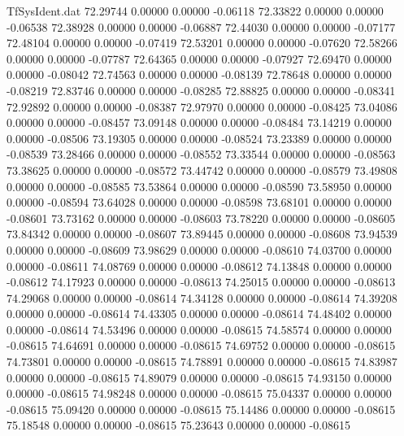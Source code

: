 \begin{filecontents}{TfSysIdent.dat}
  72.29744    0.00000    0.00000   -0.06118
  72.33822    0.00000    0.00000   -0.06538
  72.38928    0.00000    0.00000   -0.06887
  72.44030    0.00000    0.00000   -0.07177
  72.48104    0.00000    0.00000   -0.07419
  72.53201    0.00000    0.00000   -0.07620
  72.58266    0.00000    0.00000   -0.07787
  72.64365    0.00000    0.00000   -0.07927
  72.69470    0.00000    0.00000   -0.08042
  72.74563    0.00000    0.00000   -0.08139
  72.78648    0.00000    0.00000   -0.08219
  72.83746    0.00000    0.00000   -0.08285
  72.88825    0.00000    0.00000   -0.08341
  72.92892    0.00000    0.00000   -0.08387
  72.97970    0.00000    0.00000   -0.08425
  73.04086    0.00000    0.00000   -0.08457
  73.09148    0.00000    0.00000   -0.08484
  73.14219    0.00000    0.00000   -0.08506
  73.19305    0.00000    0.00000   -0.08524
  73.23389    0.00000    0.00000   -0.08539
  73.28466    0.00000    0.00000   -0.08552
  73.33544    0.00000    0.00000   -0.08563
  73.38625    0.00000    0.00000   -0.08572
  73.44742    0.00000    0.00000   -0.08579
  73.49808    0.00000    0.00000   -0.08585
  73.53864    0.00000    0.00000   -0.08590
  73.58950    0.00000    0.00000   -0.08594
  73.64028    0.00000    0.00000   -0.08598
  73.68101    0.00000    0.00000   -0.08601
  73.73162    0.00000    0.00000   -0.08603
  73.78220    0.00000    0.00000   -0.08605
  73.84342    0.00000    0.00000   -0.08607
  73.89445    0.00000    0.00000   -0.08608
  73.94539    0.00000    0.00000   -0.08609
  73.98629    0.00000    0.00000   -0.08610
  74.03700    0.00000    0.00000   -0.08611
  74.08769    0.00000    0.00000   -0.08612
  74.13848    0.00000    0.00000   -0.08612
  74.17923    0.00000    0.00000   -0.08613
  74.25015    0.00000    0.00000   -0.08613
  74.29068    0.00000    0.00000   -0.08614
  74.34128    0.00000    0.00000   -0.08614
  74.39208    0.00000    0.00000   -0.08614
  74.43305    0.00000    0.00000   -0.08614
  74.48402    0.00000    0.00000   -0.08614
  74.53496    0.00000    0.00000   -0.08615
  74.58574    0.00000    0.00000   -0.08615
  74.64691    0.00000    0.00000   -0.08615
  74.69752    0.00000    0.00000   -0.08615
  74.73801    0.00000    0.00000   -0.08615
  74.78891    0.00000    0.00000   -0.08615
  74.83987    0.00000    0.00000   -0.08615
  74.89079    0.00000    0.00000   -0.08615
  74.93150    0.00000    0.00000   -0.08615
  74.98248    0.00000    0.00000   -0.08615
  75.04337    0.00000    0.00000   -0.08615
  75.09420    0.00000    0.00000   -0.08615
  75.14486    0.00000    0.00000   -0.08615
  75.18548    0.00000    0.00000   -0.08615
  75.23643    0.00000    0.00000   -0.08615

\end{filecontents}
